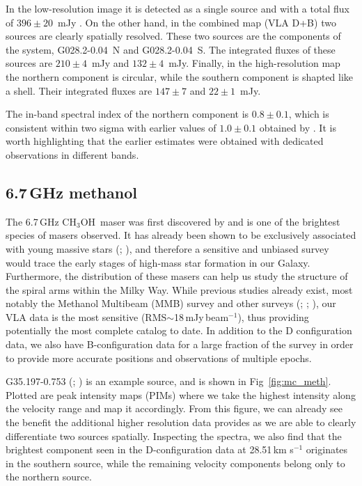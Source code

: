 \documentclass{aa}
\newcommand{\meth}{\mbox{CH$_{3}$OH}~}
\begin{document}
In the low-resolution image it is detected as a single source and with a total flux of $396\pm20$~mJy \citep[labeled  G028.200-00.050 in our catalog;][]{Medina2019}. On the other hand, in the combined map (VLA D+B) two sources are clearly spatially resolved. These two sources are the components of the system, G028.2-0.04~N and G028.2-0.04~S. The integrated fluxes of these sources are $210\pm4$~mJy and $132\pm4$~mJy. Finally, in the high-resolution map  the northern component is circular, while the southern component is shapted like a shell. Their integrated fluxes are $147\pm7$ and $22\pm1$~mJy. 



The in-band spectral index of the northern component is $0.8\pm0.1$, which is consistent within two sigma with earlier values of $1.0\pm0.1$ obtained by \citet{sewilo2004}.
It is worth  highlighting that the earlier estimates 
were obtained with dedicated observations in different bands. 


\subsection{6.7\,GHz methanol}

The 6.7\,GHz \meth maser was first discovered by \cite{menten1991} and is  one of the brightest species of masers observed. It has already been shown to be exclusively associated
with young massive stars (\citealt{minier2003}; \citealt{xu2008}), and therefore a sensitive and unbiased survey would trace the early stages of high-mass star formation in our Galaxy.
Furthermore, the distribution of these masers can help us study the structure of the spiral arms within the Milky Way. While previous studies already exist, most notably the Methanol Multibeam (MMB) survey \citep{mmb} and other surveys
(\citealt{pesta2005}; \citealt{Pandian2007}; \citealt{yang2019}), our VLA data is the most sensitive
(RMS$\sim$18\,mJy\,beam$^{-1}$), thus providing potentially the most complete catalog to 
date. In addition to the D configuration data, we also have B-configuration data for a large fraction of the survey in order to provide more accurate positions and observations of multiple epochs. 

G35.197-0.753 (\citealt{xu2008}; \citealt{mmb20_60}) is an example source, and is shown in Fig~\ref{fig:mc_meth}. Plotted are peak intensity maps (PIMs) where we take the highest 
intensity along the velocity range and map it accordingly. From this figure, we can  already see the
benefit the additional higher resolution data provides as we are able to clearly differentiate
two sources spatially. Inspecting the spectra, we  also find that the brightest component seen in the D-configuration data at 28.51\,km s$^{-1}$ originates in the southern source, while the
remaining velocity components belong only to the northern source.
\end{document}
